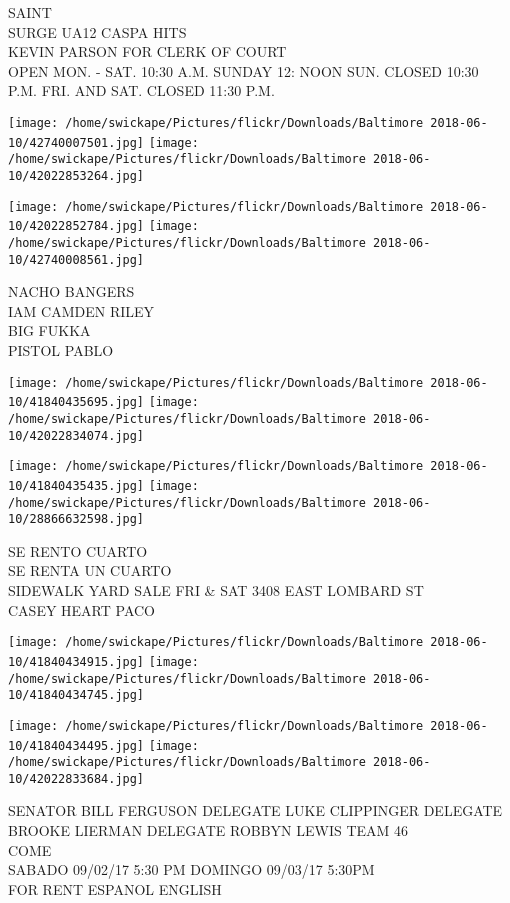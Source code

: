 \documentclass[10pt,letterpaper]{article}
\begin{document}
SAINT\\
SURGE UA12 CASPA HITS\\
KEVIN PARSON FOR CLERK OF COURT\\
OPEN MON. {-} SAT. 10:30 A.M. SUNDAY 12: NOON SUN. CLOSED 10:30 P.M. FRI. AND SAT. CLOSED 11:30 P.M.
\pagebreak

\texttt{[image: /home/swickape/Pictures/flickr/Downloads/Baltimore 2018-06-10/42740007501.jpg]}
\texttt{[image: /home/swickape/Pictures/flickr/Downloads/Baltimore 2018-06-10/42022853264.jpg]}

\texttt{[image: /home/swickape/Pictures/flickr/Downloads/Baltimore 2018-06-10/42022852784.jpg]}
\texttt{[image: /home/swickape/Pictures/flickr/Downloads/Baltimore 2018-06-10/42740008561.jpg]}

NACHO BANGERS\\
IAM CAMDEN RILEY\\
BIG FUKKA\\
PISTOL PABLO
\pagebreak

\texttt{[image: /home/swickape/Pictures/flickr/Downloads/Baltimore 2018-06-10/41840435695.jpg]}
\texttt{[image: /home/swickape/Pictures/flickr/Downloads/Baltimore 2018-06-10/42022834074.jpg]}

\texttt{[image: /home/swickape/Pictures/flickr/Downloads/Baltimore 2018-06-10/41840435435.jpg]}
\texttt{[image: /home/swickape/Pictures/flickr/Downloads/Baltimore 2018-06-10/28866632598.jpg]}

SE RENTO CUARTO\\
SE RENTA UN CUARTO\\
SIDEWALK YARD SALE FRI \& SAT 3408 EAST LOMBARD ST\\
CASEY HEART PACO
\pagebreak

\texttt{[image: /home/swickape/Pictures/flickr/Downloads/Baltimore 2018-06-10/41840434915.jpg]}
\texttt{[image: /home/swickape/Pictures/flickr/Downloads/Baltimore 2018-06-10/41840434745.jpg]}

\texttt{[image: /home/swickape/Pictures/flickr/Downloads/Baltimore 2018-06-10/41840434495.jpg]}
\texttt{[image: /home/swickape/Pictures/flickr/Downloads/Baltimore 2018-06-10/42022833684.jpg]}

SENATOR BILL FERGUSON DELEGATE LUKE CLIPPINGER DELEGATE BROOKE LIERMAN DELEGATE ROBBYN LEWIS TEAM 46\\
COME\\
SABADO 09/02/17 5:30 PM DOMINGO 09/03/17 5:30PM\\
FOR RENT ESPANOL ENGLISH
\pagebreak
\end{document}
